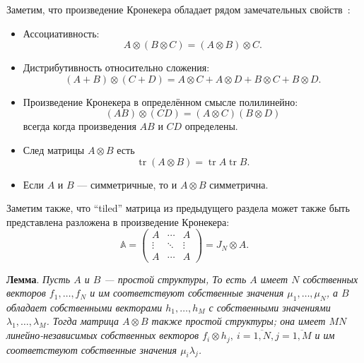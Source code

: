 \documentclass[12pt]{article}
\begin{document}
Заметим, что произведение Кронекера обладает рядом замечательных свойств~\cite{bellman-matrices-kron}:
\begin{itemize}
\item Ассоциативность:
    \[ A\otimes (B\otimes C) = (A\otimes B)\otimes C. \]
\item Дистрибутивность относительно сложения:
    \[ (A+B)\otimes(C+D) = A\otimes C + A\otimes D + B\otimes C + B\otimes D. \]
\item Произведение Кронекера в определённом смысле полилинейно:
    \[ (AB)\otimes(CD) = (A\otimes C)(B\otimes D) \]
    всегда когда произведения \( AB \) и \( CD \) определены.
\item След матрицы \( A\otimes B \) есть \[ \operatorname{tr}(A\otimes B) = \operatorname{tr}A\operatorname{tr}B. \]
\item Если \( A \) и \( B \) --- симметричные,
      то и \( A\otimes B \) симметрична.
\end{itemize}
Заметим также, что ``tiled'' матрица из предыдущего раздела
    может также быть представлена разложена в произведение Кронекера:
\[
    \mathbb{A} =
    \begin{pmatrix}
    A & \cdots & A\\
    \vdots & \ddots & \vdots \\
    A & \cdots & A\end{pmatrix} =
        J_N\otimes A.
    \]

\begingroup
\textbf{Лемма}.
\itshape
Пусть \( A \) и \( B \) --- простой структуры,
    То есть \( A \) имеет \( N \) собственных векторов
    \( f_1, \ldots, f_N \)
    и им соответствуют собственные значения \( \mu_1, \ldots, \mu_N \),
    а \( B \) обладает собственными векторами \( h_1, \ldots, h_M \)
    с собственными значениями \( \lambda_1, \ldots, \lambda_M \).
Тогда матрица \( A\otimes B \) также простой структуры;
    она имеет \( MN \) линейно-независимых собственных векторов
    \( f_i\otimes h_j,\ i{=}\overline{1,N}, j{=}\overline{1,M} \)
    и им соответствуют собственные значения \( \mu_i \lambda_j \).
\endgroup
\end{document}
